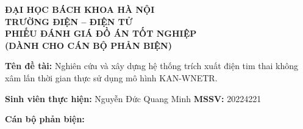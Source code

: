 \documentclass[DoAn.tex]{subfiles}
\begin{document}
\thispagestyle{empty}
\setlength{\parindent}{0pt}
\singlespacing
\raggedbottom

\begin{center}
  {\textbf{ĐẠI HỌC BÁCH KHOA HÀ NỘI}}\\
  {\textbf{TRƯỜNG ĐIỆN -- ĐIỆN TỬ}}\\[0.4cm]
  {\large\textbf{PHIẾU ĐÁNH GIÁ ĐỒ ÁN TỐT NGHIỆP}}\\[0.15cm]
  {\textbf{(DÀNH CHO CÁN BỘ PHẢN BIỆN)}}
\end{center}

\vspace{-0.2cm}

\noindent
\textbf{Tên đề tài:} Nghiên cứu và xây dựng hệ thống trích xuất điện tim thai không xâm lấn thời gian thực sử dụng mô hình KAN-WNETR.\par
\vspace{0.05cm}
\noindent\textbf{Sinh viên thực hiện:} Nguyễn Đức Quang Minh \hfill \textbf{MSSV:} 20224221\par
\vspace{0.05cm}
\noindent\textbf{Cán bộ phản biện:} \dotuline{\hspace{14.3cm}}\par
\vspace{-0.5cm}
\end{document}
